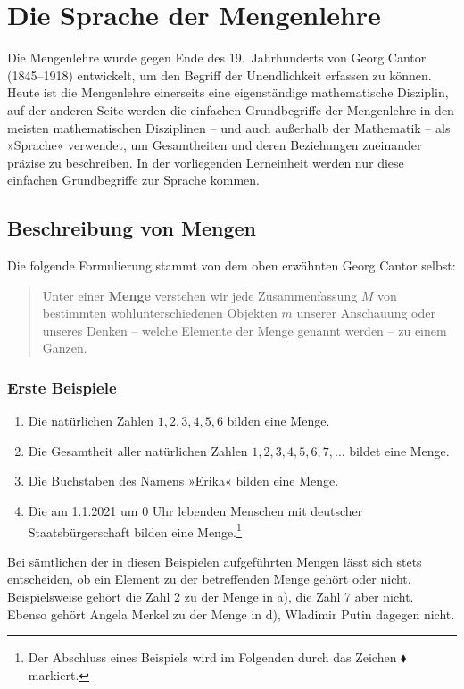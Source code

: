 \section{Die Sprache der Mengenlehre}

Die Mengenlehre wurde gegen Ende des 19.\ Jahrhunderts von Georg Cantor (1845--1918) entwickelt, um den Begriff der Unendlichkeit erfassen zu können. Heute ist die Mengenlehre einerseits eine eigenständige mathematische Disziplin, auf der anderen Seite werden die einfachen Grundbegriffe der Mengenlehre in den meisten mathematischen Disziplinen -- und auch außerhalb der Mathematik -- als »Sprache« verwendet, um Gesamtheiten und deren Beziehungen zueinander präzise zu beschreiben. In der vorliegenden Lerneinheit werden nur diese einfachen Grundbegriffe zur Sprache kommen.

\subsection{Beschreibung von Mengen}

Die folgende Formulierung stammt von dem oben erwähnten Georg Cantor selbst:

\begin{quote}
  Unter einer \textbf{Menge} verstehen wir jede Zusammenfassung $M$ von bestimmten wohlunterschiedenen Objekten $m$ unserer Anschauung oder unseres Denken -- welche Elemente der Menge genannt werden -- zu einem Ganzen.
\end{quote}

\subsubsection{Erste Beispiele}

\begin{enumerate}[label=\alph*)]
  \item Die natürlichen Zahlen $1, 2, 3, 4, 5, 6$ bilden eine Menge.
  \item Die Gesamtheit aller natürlichen Zahlen $1, 2, 3, 4, 5, 6, 7, \ldots$ bildet eine Menge.
  \item Die Buchstaben des Namens »Erika« bilden eine Menge.
  \item Die am 1.1.2021 um 0 Uhr lebenden Menschen mit deutscher Staatsbürgerschaft bilden eine Menge.\footnote{Der Abschluss eines Beispiels wird im Folgenden durch das Zeichen $\blacklozenge$ markiert.}\beispielende
\end{enumerate}

Bei sämtlichen der in diesen Beispielen aufgeführten Mengen lässt sich stets entscheiden, ob ein Element zu der betreffenden Menge gehört oder nicht. Beispielsweise gehört die Zahl 2 zu der Menge in a), die Zahl 7 aber nicht. Ebenso gehört Angela Merkel zu der Menge in d), Wladimir Putin dagegen nicht.

